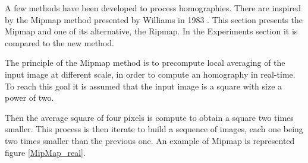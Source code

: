 
A few methods have been developed to process homographies. There are inspired by the Mipmap method presented by Williams in 1983 \cite{williams1983pyramidal}. This section presents the Mipmap and one of its alternative, the Ripmap. In the Experiments section it is compared to the new method.


\label{Mipmap}
The principle of the Mipmap method is to precompute local averaging of the input image at different scale, in order to compute an homography in real-time. To reach this goal it is assumed that the input image is a square with size a power of two.

Then the average square of four pixels is compute to obtain a square two times smaller. This process is then iterate to build a sequence of images, each one being two times smaller than the previous one. An example of Mipmap is represented figure \ref{MipMap_real}.





